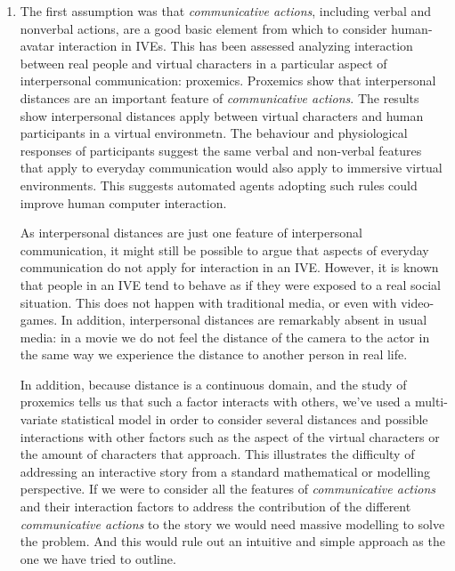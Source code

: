 \documentclass[
		twoside,openright,titlepage,numbers=noenddot,manychapters,
		headinclude,%
                footinclude=false,cleardoublepage=empty,
                BCOR=5mm,
		fontsize=11pt, %
                 enabledeprecatedfontcommands]{scrreprt}
\begin{document}
 \begin{enumerate}


\item The first assumption was that \emph{communicative actions}, including verbal and nonverbal actions, are a good basic element from which to consider human-avatar interaction in IVEs. This has been assessed analyzing interaction between real people and virtual characters in a particular aspect of interpersonal communication:  proxemics. Proxemics show that interpersonal distances are an important feature of \emph{communicative actions}.  The results show interpersonal distances apply between virtual characters and human participants in a virtual environmetn. The behaviour and physiological responses of participants suggest the same verbal and non-verbal features that apply to everyday communication would also apply to immersive virtual environments. This suggests automated agents adopting such rules could improve human computer interaction.

As interpersonal distances are just one feature of interpersonal communication, it might still be possible to argue that aspects of everyday communication do not apply for interaction in an IVE. However, it is known that people in an IVE tend to behave as if they were exposed to a real social situation. This does not happen with traditional media, or even with video-games. In addition, interpersonal distances are remarkably absent in usual media: in a movie we do not feel the distance of the camera to the actor in the same way we experience the distance to another person in real life. 

In addition, because distance is a continuous domain, and the study of proxemics tells us that such a factor interacts with others, we've used a multi-variate statistical model  in order to consider several distances and possible interactions with other factors such as the aspect of the virtual characters or the amount of characters that approach.  This illustrates the difficulty of addressing an interactive story from a standard mathematical or modelling perspective. If we were to consider all the features of \emph{communicative actions} and their interaction factors to address the contribution of the different \emph{communicative actions} to the story we would need massive modelling to solve the problem. And this would rule out an intuitive and simple approach as the one we have tried to outline.

   



\end{enumerate}
\end{document}
